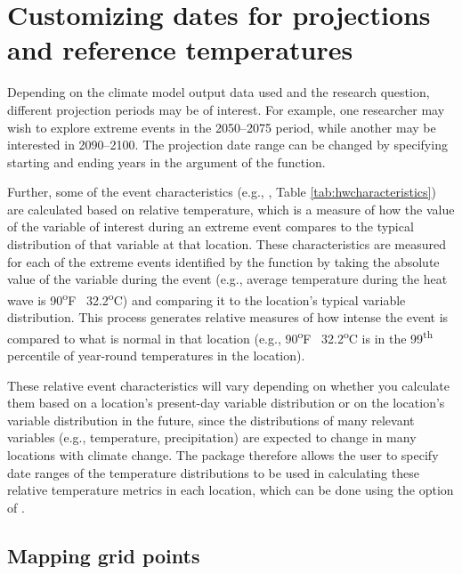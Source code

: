 \section{Customizing dates for projections and reference
temperatures}\label{customizing-dates-for-projections-and-reference-temperatures}

Depending on the climate model output data used and the research
question, different projection periods may be of interest. For example,
one researcher may wish to explore extreme events in the 2050--2075
period, while another may be interested in 2090--2100. The projection
date range can be changed by specifying starting and ending years in the
 argument of the 
function.

Further, some of the event characteristics (e.g.,
, Table \ref{tab:hwcharacteristics}) are
calculated based on relative temperature, which is a measure of how the
value of the variable of interest during an extreme event compares to
the typical distribution of that variable at that location. These
characteristics are measured for each of the extreme events identified
by the  function by taking the absolute value of the
variable during the event (e.g., average temperature during the heat
wave is 90\textsuperscript{o}F ~32.2\textsuperscript{o}C) and comparing
it to the location's typical variable distribution. This process
generates relative measures of how intense the event is compared to what
is normal in that location (e.g., 90\textsuperscript{o}F
~32.2\textsuperscript{o}C is in the 99\textsuperscript{th} percentile of
year-round temperatures in the location).

These relative event characteristics will vary depending on whether you
calculate them based on a location's present-day variable distribution
or on the location's variable distribution in the future, since the
distributions of many relevant variables (e.g., temperature,
precipitation) are expected to change in many locations with climate
change. The package therefore allows the user to specify date ranges of
the temperature distributions to be used in calculating these relative
temperature metrics in each location, which can be done using the
 option of .

\subsection{Mapping grid points}\label{mapping-grid-points}

